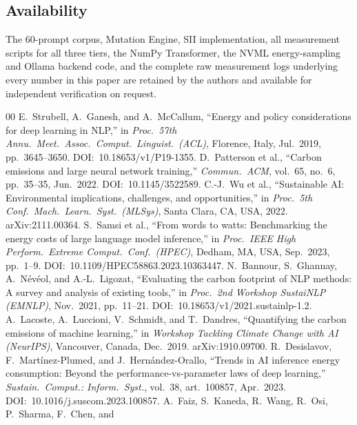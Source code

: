 \documentclass[conference]{IEEEtran}
\begin{document}
\subsection*{Availability}
The 60-prompt corpus, Mutation Engine, SII implementation, all
measurement scripts for all three tiers, the NumPy Transformer, the
NVML energy-sampling and Ollama backend code, and the complete raw
measurement logs underlying every number in this paper are retained by
the authors and available for independent verification on request.
\balance
\begin{thebibliography}{00}
E.~Strubell, A.~Ganesh, and A.~McCallum,
``Energy and policy considerations for deep learning in NLP,''
in \textit{Proc.\ 57th Annu.\ Meet.\ Assoc.\ Comput.\ Linguist.\ (ACL)},
Florence, Italy, Jul.~2019, pp.~3645--3650.
DOI:~10.18653/v1/P19-1355.
D.~Patterson et al.,
``Carbon emissions and large neural network training,''
\textit{Commun.\ ACM}, vol.~65, no.~6, pp.~35--35, Jun.~2022.
DOI:~10.1145/3522589.
C.-J.~Wu et al.,
``Sustainable AI: Environmental implications, challenges,
and opportunities,''
in \textit{Proc.\ 5th Conf.\ Mach.\ Learn.\ Syst.\ (MLSys)},
Santa Clara, CA, USA, 2022.
arXiv:2111.00364.
S.~Samsi et al.,
``From words to watts: Benchmarking the energy costs of large
language model inference,''
in \textit{Proc.\ IEEE High Perform.\ Extreme Comput.\ Conf.\
(HPEC)}, Dedham, MA, USA, Sep.~2023, pp.~1--9.
DOI:~10.1109/HPEC58863.2023.10363447.
N.~Bannour, S.~Ghannay, A.~N\'ev\'eol, and A.-L.~Ligozat,
``Evaluating the carbon footprint of NLP methods: A survey
and analysis of existing tools,''
in \textit{Proc.\ 2nd Workshop SustaiNLP (EMNLP)},
Nov.~2021, pp.~11--21.
DOI:~10.18653/v1/2021.sustainlp-1.2.
A.~Lacoste, A.~Luccioni, V.~Schmidt, and T.~Dandres,
``Quantifying the carbon emissions of machine learning,''
in \textit{Workshop Tackling Climate Change with AI (NeurIPS)},
Vancouver, Canada, Dec.~2019.
arXiv:1910.09700.
R.~Desislavov, F.~Mart\'inez-Plumed, and J.~Hern\'andez-Orallo,
``Trends in AI inference energy consumption: Beyond the
performance-vs-parameter laws of deep learning,''
\textit{Sustain.\ Comput.: Inform.\ Syst.}, vol.~38,
art.~100857, Apr.~2023.
DOI:~10.1016/j.suscom.2023.100857.
A.~Faiz, S.~Kaneda, R.~Wang, R.~Osi, P.~Sharma, F.~Chen, and

\end{thebibliography}
\end{document}
